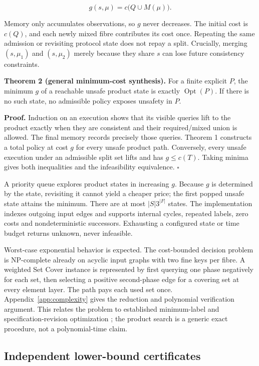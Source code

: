 \[
g(s,\mu)=c\bigl(Q\cup M(\mu)\bigr).
\]

Memory only accumulates observations, so \(g\) never decreases. The
initial cost is \(c(Q)\), and each newly mixed fibre contributes its
cost once. Repeating the same admission or revisiting protocol state
does not repay a split. Crucially, merging \((s,\mu_1)\) and
\((s,\mu_2)\) merely because they share \(s\) can lose future
consistency constraints.

\textbf{Theorem 2 (general minimum-cost synthesis).} For a finite
explicit \(P\), the minimum \(g\) of a reachable unsafe product state is
exactly \(\operatorname{Opt}(P)\). If there is no such state, no
admissible policy exposes unsafety in \(P\).

\textbf{Proof.} Induction on an execution shows that its visible queries
lift to the product exactly when they are consistent and their
required/mixed union is allowed. The final memory records precisely
those queries. Theorem 1 constructs a total policy at cost \(g\) for
every unsafe product path. Conversely, every unsafe execution under an
admissible split set lifts and has \(g\le c(T)\). Taking minima gives
both inequalities and the infeasibility equivalence. \(\square\)

A priority queue explores product states in increasing \(g\). Because
\(g\) is determined by the state, revisiting it cannot yield a cheaper
price; the first popped unsafe state attains the minimum. There are at
most \(|S|3^{|F|}\) states. The implementation indexes outgoing input
edges and supports internal cycles, repeated labels, zero costs and
nondeterministic successors. Exhausting a configured state or time
budget returns unknown, never infeasible.

Worst-case exponential behavior is expected. The cost-bounded decision
problem is NP-complete already on acyclic input graphs with two fine
keys per fibre. A weighted Set Cover instance is represented by first
querying one phase negatively for each set, then selecting a positive
second-phase edge for a covering set at every element layer. The path
pays each used set once. Appendix~\ref{app:complexity} gives the
reduction and polynomial verification argument. This relates the problem
to established minimum-label and specification-revision optimization
\cite{karp1972reducibility,kim2015revision,kumar2021color}; the product
search is a generic exact procedure, not a polynomial-time claim.

\subsection{Independent lower-bound
certificates}\label{independent-lower-bound-certificates}

